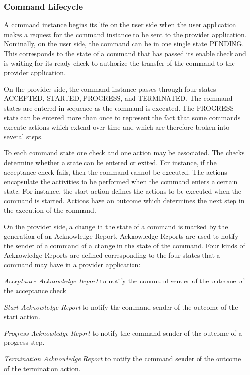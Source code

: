 \subsubsection{Command Lifecycle}\label{sec:CmdLifecycle}
A command instance begins its life on the user side when the user application makes a request for the command instance to be sent to the provider application. Nominally, on the user side, the command can be in one single state PENDING. This corresponds to the state of a command that has passed its enable check and is waiting for its ready check to authorize the transfer of the command to the provider application. 

On the provider side, the command instance passes through four states: ACCEPTED, STARTED, PROGRESS, and TERMINATED. The command states are entered in sequence as the command is executed. The PROGRESS state can be entered more than once to represent the fact that some commands execute actions which extend over time and which are therefore broken into several steps.

To each command state one check and one action may be associated. The checks determine whether a state can be entered or exited. For instance, if the acceptance check fails, then the command cannot be executed. The actions encapsulate the activities to be performed when the command enters a certain state. For instance, the start action defines the actions to be executed when the command is started. Actions have an outcome which determines the next step in the execution of the command.

On the provider side, a change in the state of a command is marked by the generation of an Acknowledge Report. Acknowledge Reports are used to notify the sender of a command of a change in the state of the command. Four kinds of Acknowledge Reports are defined corresponding to the four states that a command may have in a provider application:

\begin{fw_itemize}
\item{\textit{Acceptance Acknowledge Report}} to notify the command sender of the outcome of the acceptance check.
\item{\textit{Start Acknowledge Report}} to notify the command sender of the outcome of the start action.
\item{\textit{Progress Acknowledge Report}} to notify the command sender of the outcome of a progress step.
\item{\textit{Termination Acknowledge Report}} to notify the command sender of the outcome of the termination action.
\end{fw_itemize}

